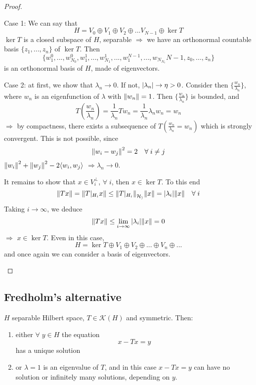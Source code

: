 \begin{proof}
\begin{itemize}
        Case 1: We can say that 
        \[
            H = V_0 \oplus V_1 \oplus V_2 \oplus ... V_{N-1} \oplus \ker T
        \]
        \(\ker T\) is a closed subspace of \(H\), separable \(\Rightarrow\) we have an orthonormal countable basis \(\{z_1, ... , z_n\}\) of \(\ker T\). Then
        \[
            \{w_1^0, ..., w_{N_0}^0, w_1^1, ..., w_{N_1}^1, ..., w_1^{N-1}, ..., w_{N_{N_1}}{N-1}, z_0, ..., z_n \} 
        \]
        is an orthonormal basis of \(H\), made of eigenvectors.

        Case 2: at first, we show that \(\lambda_n \to 0\). If not, \(\abs{\lambda_n} \to \eta > 0\). 
        Consider then \(\{\frac{w_n}{\lambda_n}\}\), where \(w_n\) is an eigenfunction of \(\lambda\) with \(\norm{w_n}=1\). Then \(\{\frac{w_n}{\lambda_n}\}\) is bounded, and
        \[
            T(\frac{w_n}{\lambda_n}) = \frac{1}{\lambda_n} T w_n = \frac{1}{\lambda_n} \lambda_n w_n = w_n
        \]
        \(\Rightarrow\) by compactness, there exists a subsequence of \(T(\frac{w_n}{\lambda_n}= w_n)\) which is strongly convergent.
        This is not possible, since
        \[
            \norm{w_i - w_j}^2 = 2 \quad \forall\; i \neq j
        \]
        \(\norm{w_i}^2 + \norm{w_j}^2 -2\langle w_i, w_j\rangle\) \(\Rightarrow \lambda_n \to 0\).

        It remains to show that \(x \in V_i^\perp\), \(\forall\; i\), then \(x \in \ker T\). To this end
        \[
            \norm{Tx} = \norm{T|_{H_i} x} \leq \norm{T|_{H_i}}_{\mathcal{H_i}} \norm{x} = \abs{\lambda_i} \norm{x} \quad \forall\;i 
        \]
        Taking \(i \to \infty\), we deduce
        \[
            \norm{Tx} \leq \lim_{i \to \infty} \abs{\lambda_i} \norm{x} = 0
        \]
        \(\Rightarrow\) \(x \in \ker T\). Even in this case, 
        \[
            H = \ker T \oplus V_1 \oplus V_2 \oplus ... \oplus V_n \oplus ...
        \]
        and once again we can consider a basis of eigenvectors.
    \end{itemize}
\end{proof}
\subsection{Fredholm's alternative}
\begin{corollary}
    \(H\) separable Hilbert space, \(T \in \mathcal{K}(H) \) and symmetric. Then:
    \begin{enumerate}
        \item either \(\forall\; y \in H\) the equation
        \[
            x - Tx = y
        \]
        has a unique solution
        \item or \(\lambda=1\) is an eigenvalue of \(T\), and in this case \(x - Tx = y\) can have no solution or infinitely many solutions, depending on \(y\).
    \end{enumerate}
\end{corollary}

